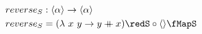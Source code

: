 \documentclass[preview]{standalone}
\begin{document}
\begin{align*}
  reverse_S &: \vect{\alpha} \rightarrow \vect{\alpha} \\
  reverse_S & = (\lambda\ x\ y \rightarrow y \fcat x) \redS \circ \vect{} \fMapS
\end{align*}
\end{document}
